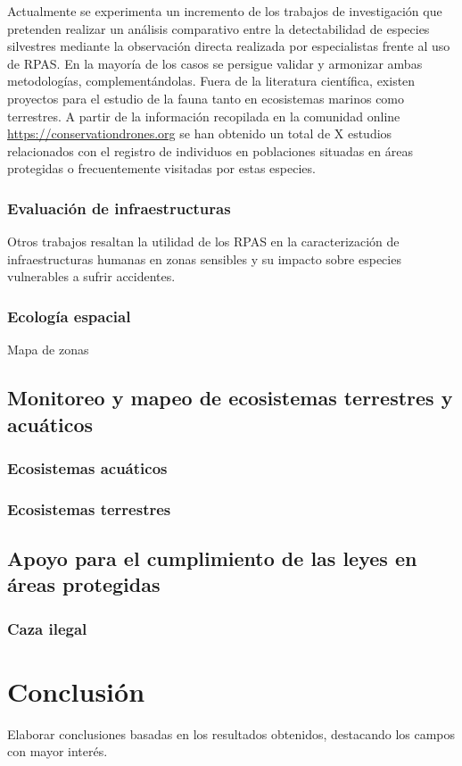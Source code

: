 \documentclass[11pt,]{article}
\begin{document}
Actualmente se experimenta un incremento de los trabajos de
investigación que pretenden realizar un análisis comparativo entre la
detectabilidad de especies silvestres mediante la observación directa
realizada por especialistas frente al uso de RPAS. En la mayoría de los
casos se persigue validar y armonizar ambas metodologías,
complementándolas. Fuera de la literatura científica, existen proyectos
para el estudio de la fauna tanto en ecosistemas marinos como
terrestres. A partir de la información recopilada en la comunidad online
\url{https://conservationdrones.org} se han obtenido un total de X
estudios relacionados con el registro de individuos en poblaciones
situadas en áreas protegidas o frecuentemente visitadas por estas
especies.

\subsubsection{Evaluación de
infraestructuras}\label{evaluacion-de-infraestructuras}

Otros trabajos resaltan la utilidad de los RPAS en la caracterización de
infraestructuras humanas en zonas sensibles y su impacto sobre especies
vulnerables a sufrir accidentes.

\subsubsection{Ecología espacial}\label{ecologia-espacial}

Mapa de zonas

\subsection{Monitoreo y mapeo de ecosistemas terrestres y
acuáticos}\label{monitoreo-y-mapeo-de-ecosistemas-terrestres-y-acuaticos}

\subsubsection{Ecosistemas acuáticos}\label{ecosistemas-acuaticos}

\subsubsection{Ecosistemas terrestres}\label{ecosistemas-terrestres}

\subsection{Apoyo para el cumplimiento de las leyes en áreas
protegidas}\label{apoyo-para-el-cumplimiento-de-las-leyes-en-areas-protegidas}

\subsubsection{Caza ilegal}\label{caza-ilegal}

\section{Conclusión}\label{conclusion}

Elaborar conclusiones basadas en los resultados obtenidos, destacando
los campos con mayor interés.

\newpage
\singlespacing 

\end{document}
